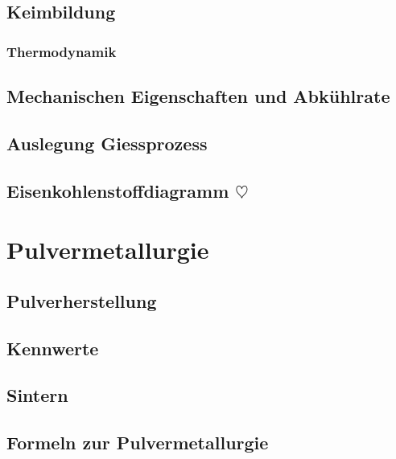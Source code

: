 \documentclass[12pt]{cheatsheet}
\begin{document}
    \subsection*{Keimbildung}
    
    \subsubsection*{Thermodynamik}
    
    \subsection*{Mechanischen Eigenschaften und Abkühlrate}
    
    \subsection*{Auslegung Giessprozess}
    
    \subsection*{Eisenkohlenstoffdiagramm $\heartsuit$}
    
    \vfill \null \columnbreak


\section*{Pulvermetallurgie}
    
    \subsection*{Pulverherstellung}
    
    \subsection*{Kennwerte}
    
    \vfill \null \columnbreak
    \subsection*{Sintern}
    
    \subsection*{Formeln zur Pulvermetallurgie}
    
\end{document}
